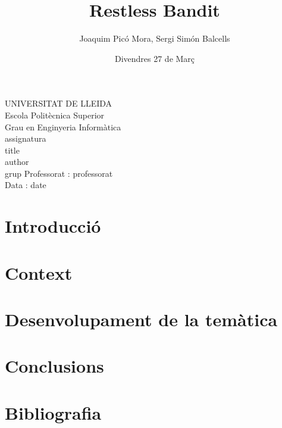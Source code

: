 \documentclass{article}
\title{Restless Bandit}
\author{Joaquim Picó Mora, Sergi Simón Balcells}
\date{Divendres 27 de Març}
\renewcommand{\maketitle}{ %
	\begin{titlepage}
		\raggedright{UNIVERSITAT DE LLEIDA \\
			Escola Politècnica Superior \\
			Grau en Enginyeria Informàtica\\
			\1assignatura\\}
		\vspace{5cm}
		\centering\huge{\5title \\}
		\vspace{3cm}
		\large{\6author} \\
		\normalsize{\3grup}
		\vfill
		Professorat : \4professorat \\
		Data : \7date
\end{titlepage}}
\begin{document}
	\maketitle
	\thispagestyle{empty}
	
	\newpage
	\tableofcontents
	\newpage
	\section{Introducció}
	 
	\section{Context}
	
	\section{Desenvolupament de la temàtica}
	
	
	\section{Conclusions}
	\section{Bibliografia}
	
\end{document}
